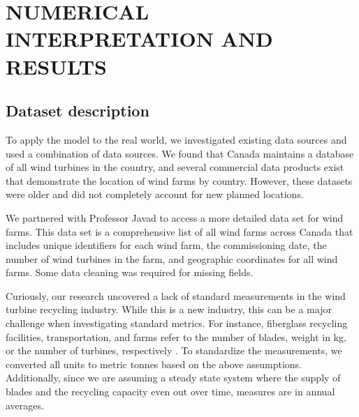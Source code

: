 \section{NUMERICAL INTERPRETATION AND RESULTS}



\subsection{Dataset description}
\label{subsection:dataset_description}
To apply the model to the real world, we investigated existing data sources and used a combination of data sources. We found that Canada maintains a database of all wind turbines in the country, and several commercial data products exist that demonstrate the location of wind farms by country. However, these datasets were older and did not completely account for new planned locations. 

We partnered with Professor Javad to access a more detailed data set for wind farms. This data set is a comprehensive list of all wind farms across Canada that includes unique identifiers for each wind farm, the commissioning date, the number of wind turbines in the farm, and geographic coordinates for all wind farms. Some data cleaning was required for missing fields. 

Curiously, our research uncovered a lack of standard measurements in the wind turbine recycling industry. While this is a new industry, this can be a major challenge when investigating standard metrics. For instance, fiberglass recycling facilities, transportation, and farms refer to the number of blades, weight in kg, or the number of turbines, respectively \cite{RN9} \cite{RN13} \cite{RN16}. To standardize the measurements, we converted all units to metric tonnes based on the above assumptions. Additionally, since we are assuming a steady state system where the supply of blades and the recycling capacity even out over time, measures are in annual averages.  

